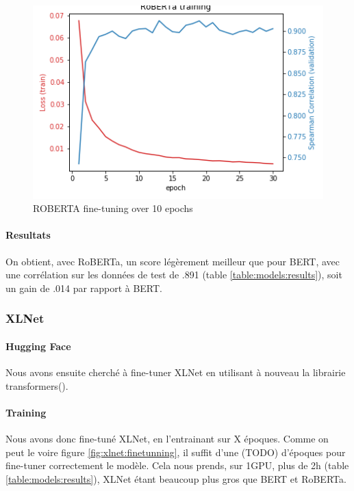 \documentclass[11pt,a4paper, french]{article}
\begin{document}
\begin{figure}
  \includegraphics[width=\linewidth]{resources/roberta-training.png}
  \caption{ROBERTA fine-tuning over 10 epochs}
  \label{fig:roberta:finetunning}
\end{figure}

\paragraph{Resultats} On obtient, avec RoBERTa, un score légèrement meilleur que pour BERT, avec une corrélation sur les données de test de .891 (table \ref{table:models:results}), soit un gain de .014 par rapport à BERT.

%
\subsubsection{XLNet}

\paragraph{Hugging Face} Nous avons ensuite cherché à fine-tuner XLNet en utilisant à nouveau la librairie transformers(\cite{huggingface}).

\paragraph{Training} Nous avons donc fine-tuné XLNet, en l'entrainant sur X époques. Comme on peut le voire figure \ref{fig:xlnet:finetunning}, il suffit d'une (TODO) d'époques pour fine-tuner correctement le modèle. Cela nous prends, sur 1GPU, plus de 2h (table \ref{table:models:results}), XLNet étant beaucoup plus gros que BERT et RoBERTa.
\end{document}
